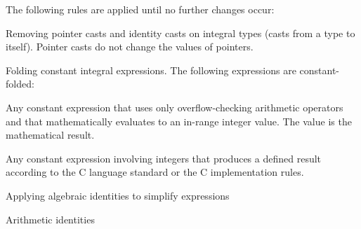 The following rules are applied until no further changes occur:

\begin{compactenum}
\item
  Removing pointer casts and identity casts on integral types (casts
  from a type to itself). Pointer casts do not change the values of
  pointers.
\item
  Folding constant integral expressions. The following expressions are
  constant-folded:

  \begin{compactenum}
  \item
    Any constant expression that uses only overflow-checking arithmetic
    operators and that mathematically evaluates to an in-range integer
    value. The value is the mathematical result.
  \item
    Any constant expression involving integers that produces a defined
    result according to the C language standard or the C implementation
    rules.
  \end{compactenum}
\item
  Applying algebraic identities to simplify expressions

  \begin{compactenum}
  \item
    Arithmetic identities


\end{compactenum}
\end{compactenum}
